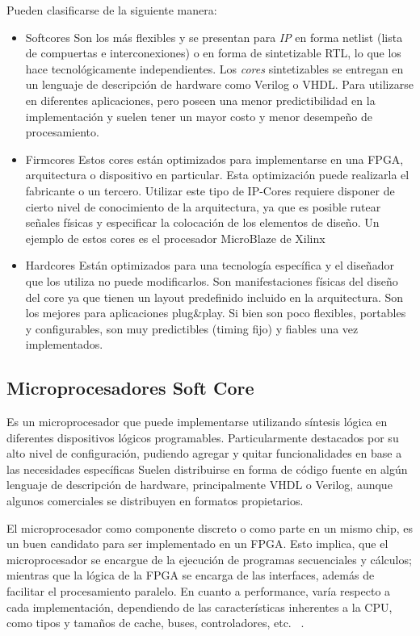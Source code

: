 \documentclass[conference]{IEEEtran}
\begin{document}
Pueden clasificarse de la siguiente manera:
 \begin{itemize}
\item{Softcores} Son los más flexibles y se presentan para \textit{IP}
  en forma netlist (lista de compuertas e interconexiones) o en forma
  de sintetizable RTL, lo que los hace tecnológicamente
  independientes. Los \textit{cores} sintetizables se entregan en un
  lenguaje de descripción de hardware como Verilog o VHDL. Para utilizarse en diferentes aplicaciones, pero poseen una menor
  predictibilidad en la implementación y suelen tener un mayor costo y
  menor desempeño de procesamiento.

\item{Firmcores} Estos cores están optimizados para
  implementarse en una FPGA, arquitectura o dispositivo en
  particular. Esta optimización puede realizarla el fabricante
  o un tercero. Utilizar este tipo de IP-Cores requiere disponer
  de cierto nivel de conocimiento de la arquitectura, ya que es
  posible rutear señales físicas y especificar la colocación de los
  elementos de diseño. Un ejemplo de estos cores es el procesador
  MicroBlaze de Xilinx~\cite{Etiqueta04}

\item{Hardcores} Están optimizados para una tecnología específica y el diseñador que los utiliza no puede modificarlos. Son
  manifestaciones físicas del diseño del core ya que tienen un layout
  predefinido incluido en la arquitectura. Son los mejores para
  aplicaciones plug\&play. Si bien son poco flexibles, portables y
  configurables, son muy predictibles (timing fijo) y fiables
  una vez implementados.
\end{itemize}

\subsection{Microprocesadores Soft Core}%

Es un microprocesador que puede implementarse utilizando síntesis lógica
en diferentes dispositivos lógicos programables. Particularmente destacados por su alto nivel de configuración, pudiendo agregar y quitar funcionalidades en base a las 
necesidades específicas \cite{Etiqueta22} Suelen distribuirse en forma de código fuente en algún lenguaje de descripción de hardware, principalmente VHDL o Verilog, aunque algunos comerciales se distribuyen en formatos propietarios.

El microprocesador como componente discreto o como parte en un mismo 
chip, es un buen candidato para ser implementado en un FPGA. Esto implica, que el microprocesador se encargue de la ejecución de programas secuenciales y cálculos; mientras que la lógica de la FPGA se encarga de las interfaces, además de facilitar el procesamiento paralelo. En cuanto a performance, varía respecto a cada implementación, dependiendo de las características inherentes a la CPU, como tipos y tamaños de cache, buses, controladores, etc. ~\cite{Etiqueta05}.
\end{document}
